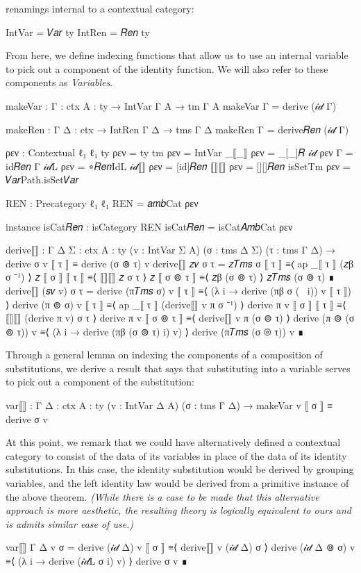 renamings internal to a contextual category:
\begin{code}
  IntVar = 𝑉𝑎𝑟 ty
  IntRen = 𝑅𝑒𝑛 ty
\end{code}
From here, we define indexing functions that allow us to use an internal
variable to pick out a component of the identity function. We will also refer to
these components as \emph{Variables}.
\begin{code}
  makeVar : {Γ : ctx} {A : ty} → IntVar Γ A → tm Γ A
  makeVar {Γ} = derive (𝒾𝒹 Γ)

  makeRen : {Γ Δ : ctx} → IntRen Γ Δ → tms Γ Δ
  makeRen {Γ} = derive𝑅𝑒𝑛 (𝒾𝒹 Γ)
\end{code}
\begin{code}[hide]
  ρεν : Contextual ℓ₁ ℓ₁
  ty ρεν = ty
  tm ρεν = IntVar
  _⟦_⟧ ρεν = _[_]𝑅
  𝒾𝒹 ρεν Γ = id𝑅𝑒𝑛 Γ
  𝒾𝒹L ρεν = ∘𝑅𝑒𝑛IdL
  𝒾𝒹⟦⟧ ρεν = [id]𝑅𝑒𝑛
  ⟦⟧⟦⟧ ρεν = [][]𝑅𝑒𝑛
  isSetTm ρεν = 𝑉𝑎𝑟Path.isSet𝑉𝑎𝑟

  REN : Precategory ℓ₁ ℓ₁
  REN = 𝑎𝑚𝑏Cat ρεν

  instance
    isCat𝑅𝑒𝑛 : isCategory REN
    isCat𝑅𝑒𝑛 = isCat𝐴𝑚𝑏Cat ρεν

  derive⟦⟧ : {Γ Δ Σ : ctx} {A : ty} (v : IntVar Σ A) (σ : tms Δ Σ) (τ : tms Γ Δ) →
    derive σ v ⟦ τ ⟧ ≡ derive (σ ⊚ τ) v
  derive⟦⟧ 𝑧𝑣 σ τ =
    𝑧𝑇𝑚𝑠 σ ⟦ τ ⟧
      ≡⟨ ap _⟦ τ ⟧ (𝑧β σ ⁻¹) ⟩
    𝑧 ⟦ σ ⟧ ⟦ τ ⟧
      ≡⟨ ⟦⟧⟦⟧ 𝑧 σ τ ⟩
    𝑧 ⟦ σ ⊚ τ ⟧
      ≡⟨ 𝑧β (σ ⊚ τ) ⟩
    𝑧𝑇𝑚𝑠 (σ ⊚ τ)
      ∎
  derive⟦⟧ (𝑠𝑣 v) σ τ =
    derive (π𝑇𝑚𝑠 σ) v ⟦ τ ⟧
      ≡⟨ (λ i → derive (πβ σ (~ i)) v ⟦ τ ⟧) ⟩
    derive (π ⊚ σ) v ⟦ τ ⟧
      ≡⟨ ap _⟦ τ ⟧ (derive⟦⟧ v π σ ⁻¹) ⟩
    derive π v ⟦ σ ⟧ ⟦ τ ⟧
      ≡⟨ ⟦⟧⟦⟧ (derive π v) σ τ ⟩
    derive π v ⟦ σ ⊚ τ ⟧
      ≡⟨ derive⟦⟧ v π (σ ⊚ τ) ⟩
    derive (π ⊚ (σ ⊚ τ)) v
      ≡⟨ (λ i → derive (πβ (σ ⊚ τ) i) v) ⟩
    derive (π𝑇𝑚𝑠 (σ ⊚ τ)) v
      ∎
\end{code}
\noindent
Through a general lemma on indexing the components of a composition of
substitutions, we derive a result that says that substituting into a variable
serves to pick out a component of the substitution:
\begin{code}
  var⟦⟧ : {Γ Δ : ctx} {A : ty} (v : IntVar Δ A) (σ : tms Γ Δ) →
    makeVar v ⟦ σ ⟧ ≡ derive σ v
\end{code}
At this point, we remark that we could have alternatively defined a contextual
category to consist of the data of its variables in place of the data of its
identity substitutions. In this case, the identity substitution would be derived
by grouping variables, and the left identity law would be derived from a
primitive instance of the above theorem. \emph{(While there is a case to be made
that this alternative approach is more aesthetic, the resulting theory is
logically equivalent to ours and is admits similar ease of use.)}
\begin{code}[hide]
  var⟦⟧ {Γ} {Δ} v σ =
    derive (𝒾𝒹 Δ) v ⟦ σ ⟧
      ≡⟨ derive⟦⟧ v (𝒾𝒹 Δ) σ ⟩
    derive (𝒾𝒹 Δ ⊚ σ) v
      ≡⟨ (λ i → derive (𝒾𝒹L σ i) v) ⟩
    derive σ v
      ∎
\end{code}

